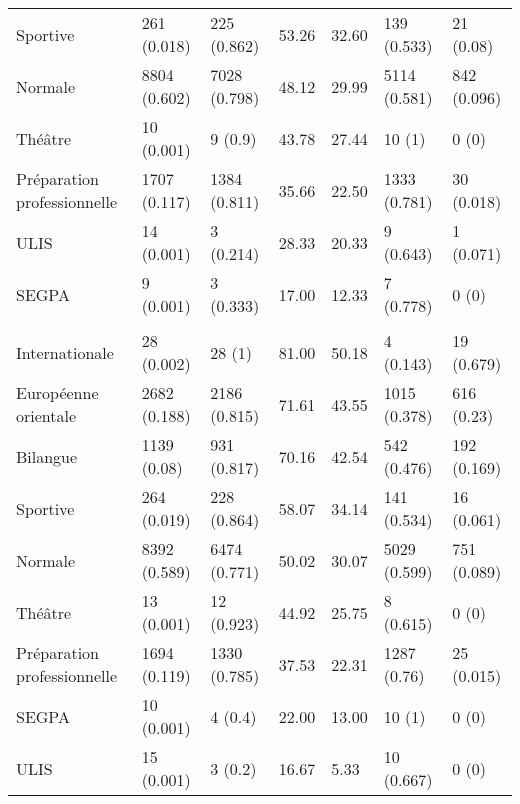 \documentclass[
]{book}
\begin{document}
\begin{ThreePartTable}
\begin{longtable}[t]{lllllll}
\hspace{1em}Sportive & 261 (0.018) & 225 (0.862) & 53.26 & 32.60 & 139 (0.533) & 21 (0.08)\\
\hspace{1em}Normale & 8804 (0.602) & 7028 (0.798) & 48.12 & 29.99 & 5114 (0.581) & 842 (0.096)\\
\hspace{1em}Théâtre & 10 (0.001) & 9 (0.9) & 43.78 & 27.44 & 10 (1) & 0 (0)\\
\hspace{1em}Préparation professionnelle & 1707 (0.117) & 1384 (0.811) & 35.66 & 22.50 & 1333 (0.781) & 30 (0.018)\\
\hspace{1em}ULIS & 14 (0.001) & 3 (0.214) & 28.33 & 20.33 & 9 (0.643) & 1 (0.071)\\
\hspace{1em}SEGPA & 9 (0.001) & 3 (0.333) & 17.00 & 12.33 & 7 (0.778) & 0 (0)\\
\addlinespace[0.3em]
\multicolumn{7}{l}{\textbf{2016}}\\
\hline
\hspace{1em}Internationale & 28 (0.002) & 28 (1) & 81.00 & 50.18 & 4 (0.143) & 19 (0.679)\\
\hspace{1em}Européenne orientale & 2682 (0.188) & 2186 (0.815) & 71.61 & 43.55 & 1015 (0.378) & 616 (0.23)\\
\hspace{1em}Bilangue & 1139 (0.08) & 931 (0.817) & 70.16 & 42.54 & 542 (0.476) & 192 (0.169)\\
\hspace{1em}Sportive & 264 (0.019) & 228 (0.864) & 58.07 & 34.14 & 141 (0.534) & 16 (0.061)\\
\hspace{1em}Normale & 8392 (0.589) & 6474 (0.771) & 50.02 & 30.07 & 5029 (0.599) & 751 (0.089)\\
\hspace{1em}Théâtre & 13 (0.001) & 12 (0.923) & 44.92 & 25.75 & 8 (0.615) & 0 (0)\\
\hspace{1em}Préparation professionnelle & 1694 (0.119) & 1330 (0.785) & 37.53 & 22.31 & 1287 (0.76) & 25 (0.015)\\
\hspace{1em}SEGPA & 10 (0.001) & 4 (0.4) & 22.00 & 13.00 & 10 (1) & 0 (0)\\
\hspace{1em}ULIS & 15 (0.001) & 3 (0.2) & 16.67 & 5.33 & 10 (0.667) & 0 (0)\\*
\end{longtable}
\end{ThreePartTable}
\endgroup{}
\end{document}
